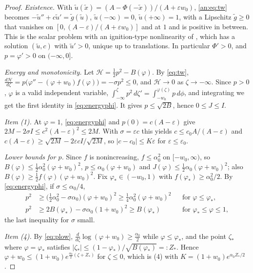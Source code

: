 \documentclass[11pt]{amsart}
\theoremstyle{definition}
\theoremstyle{remark}
\newcommand{\ve}{\varepsilon}
\begin{document}
\begin{proof}
\emph{Existence.} With $\tilde u(\tilde x)=(A-\Phi(-\tilde x))/(A+\ve w_0)$,
\eqref{an:eq:tw} becomes $-\tilde u''+c\tilde u'=\tilde g(\tilde u)$,
$\tilde u(-\infty)=0$, $\tilde u(+\infty)=1$, with a Lipschitz
$\tilde g\ge0$ that vanishes on $[0,(A-\ve)/(A+\ve w_0)]$ and at $1$ and is positive in
between. This is the scalar problem with an ignition-type nonlinearity of
\cite[Thm.~3.1]{BerestyckiNicolaenkoScheurer1985}, which has a solution $(\tilde u,c)$ with
$\tilde u'>0$, unique up to translations. In particular $\Phi'>0$, and $p=\varphi'>0$ on
$(-\infty,0]$.

\emph{Energy and monotonicity.} Let $\mathcal H=\frac12p^2-B(\varphi)$. By \eqref{eq:tw},
$\frac{d\mathcal H}{d\zeta}=p\big(\varphi''-(\varphi+w_0)f(\varphi)\big)=-\sigma p^2\le0$, and $\mathcal H\to0$ as
$\zeta\to-\infty$. Since $p>0$, $\varphi$ is a valid independent variable,
$\int_{-\infty}^{\zeta}p^2\,d\zeta'=\int_{-w_0}^{\varphi(\zeta)}p\,d\phi$, and integrating we get the
first identity in \eqref{eq:energyphi}. It gives $p\le\sqrt{2B}$, hence $0\le J\le I$.

\emph{Item (1).} At $\varphi=1$, \eqref{eq:energyphi} and $p(0)=c(A-\ve)$ give
$2M-2\sigma I\le c^2(A-\ve)^2\le 2M$. With $\sigma=\ve c$ this yields
$c\le c_0A/(A-\ve)$ and $c(A-\ve)\ge\sqrt{2M}-2\ve cI/\sqrt{2M}$, so
$|c-c_0|\le K\ve$ for $\ve\le\ve_0$.

\emph{Lower bounds for $p$.} Since $f$ is nonincreasing, $f\le\alpha_0^2$ on
$[-w_0,\infty)$, so $B(\varphi)\le\frac12\alpha_0^2(\varphi+w_0)^2$,
$p\le\alpha_0(\varphi+w_0)$ and $J(\varphi)\le\frac12\alpha_0(\varphi+w_0)^2$; also
$B(\varphi)\ge\frac12f(\varphi)(\varphi+w_0)^2$. Fix $\varphi_*\in(-w_0,1)$ with
$f(\varphi_*)\ge\alpha_0^2/2$. By \eqref{eq:energyphi}, if $\sigma\le\alpha_0/4$,
\begin{equation}\label{eq:plow}
\begin{aligned}
p^2&\ge\big(\tfrac12\alpha_0^2-\sigma\alpha_0\big)(\varphi+w_0)^2\ge\tfrac14\alpha_0^2(\varphi+w_0)^2
&&\text{for }\varphi\le\varphi_*,\\
p^2&\ge2B(\varphi_*)-\sigma\alpha_0(1+w_0)^2\ge B(\varphi_*)&&\text{for }\varphi_*\le\varphi\le1,
\end{aligned}
\end{equation}
the last inequality for $\sigma$ small.

\emph{Item (4).} By \eqref{eq:plow}, $\frac{d}{d\zeta}\log(\varphi+w_0)\ge\frac{\alpha_0}2$
while $\varphi\le\varphi_*$, and the point $\zeta_*$ where $\varphi=\varphi_*$ satisfies
$|\zeta_*|\le(1-\varphi_*)/\sqrt{B(\varphi_*)}=:Z_*$. Hence
$\varphi+w_0\le(1+w_0)e^{\frac{\alpha_0}{2}(\zeta+Z_*)}$ for $\zeta\le0$, which is (4) with
$K=(1+w_0)e^{\alpha_0Z_*/2}$.


\end{proof}
\end{document}
